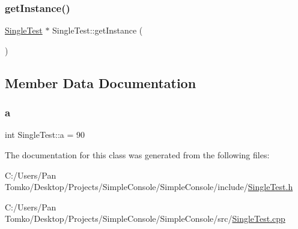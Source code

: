 \mbox{\label{class_single_test_a89f891861a229275091318f9094de769}} 
\subsubsection{\texorpdfstring{getInstance()}{getInstance()}}
{\footnotesize\ttfamily \mbox{\hyperlink{class_single_test}{Single\+Test}} $\ast$ Single\+Test\+::get\+Instance (\begin{DoxyParamCaption}{ }\end{DoxyParamCaption})\hspace{0.3cm}{\ttfamily [static]}}



\subsection{Member Data Documentation}
\mbox{\label{class_single_test_a558fbfcc1f8df7083512ebdb74114885}} 
\subsubsection{\texorpdfstring{a}{a}}
{\footnotesize\ttfamily int Single\+Test\+::a = 90}



The documentation for this class was generated from the following files\+:\begin{DoxyCompactItemize}
\item 
C\+:/\+Users/\+Pan Tomko/\+Desktop/\+Projects/\+Simple\+Console/\+Simple\+Console/include/\mbox{\hyperlink{_single_test_8h}{Single\+Test.\+h}}\item 
C\+:/\+Users/\+Pan Tomko/\+Desktop/\+Projects/\+Simple\+Console/\+Simple\+Console/src/\mbox{\hyperlink{_single_test_8cpp}{Single\+Test.\+cpp}}\end{DoxyCompactItemize}
